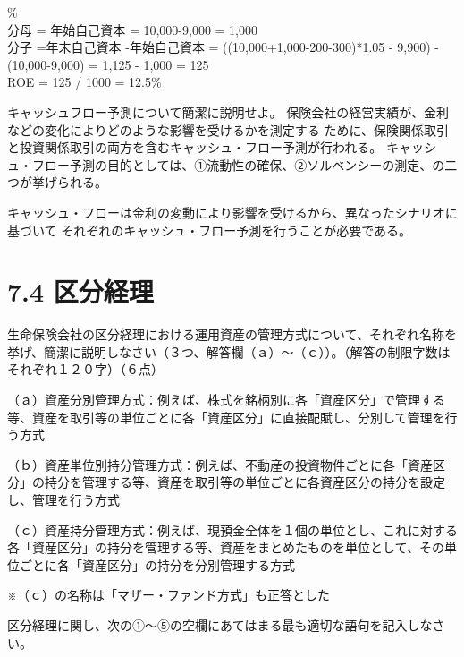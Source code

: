 \documentclass[report,gutter=10mm,fore-edge=10mm,uplatex,dvipdfmx]{jlreq}
\begin{document}
\answer{}
\%\\
分母 = 年始自己資本 = 10,000-9,000 = 1,000\\
分子 =年末自己資本 -年始自己資本 = ((10,000+1,000-200-300)*1.05 - 9,900) - (10,000-9,000) = 1,125 - 1,000 = 125\\
ROE = 125 / 1000 = 12.5\%

キャッシュフロー予測について簡潔に説明せよ。
\answer{}
保険会社の経営実績が、金利などの変化によりどのような影響を受けるかを測定する
ために、保険関係取引と投資関係取引の両方を含むキャッシュ・フロー予測が行われる。
キャッシュ・フロー予測の目的としては、①流動性の確保、②ソルベンシーの測定、の二
つが挙げられる。

キャッシュ・フローは金利の変動により影響を受けるから、異なったシナリオに基づいて
それぞれのキャッシュ・フロー予測を行うことが必要である。

\section{7.4 区分経理}

生命保険会社の区分経理における運用資産の管理方式について、それぞれ名称を挙げ、簡潔に説明しなさい（３つ、解答欄（ａ）～（ｃ））。（解答の制限字数はそれぞれ１２０字）（６点）

\answer{}
（ａ）資産分別管理方式：例えば、株式を銘柄別に各「資産区分」で管理する等、資産を取引等の単位ごとに各「資産区分」に直接配賦し、分別して管理を行う方式

（ｂ）資産単位別持分管理方式：例えば、不動産の投資物件ごとに各「資産区分」の持分を管理する等、資産を取引等の単位ごとに各資産区分の持分を設定し、管理を行う方式

（ｃ）資産持分管理方式：例えば、現預金全体を１個の単位とし、これに対する各「資産区分」の持分を管理する等、資産をまとめたものを単位として、その単位ごとに各「資産区分」の持分を分別管理する方式

 ※（ｃ）の名称は「マザー・ファンド方式」も正答とした

区分経理に関し、次の①～⑤の空欄にあてはまる最も適切な語句を記入しなさい。
\end{document}
